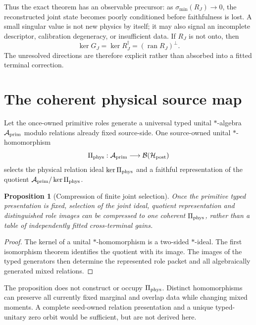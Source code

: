 \documentclass[11pt]{article}
\newtheorem{proposition}{Proposition}
\newcommand{\Aprim}{\mathcal A_{\rm prim}}
\begin{document}
Thus the exact theorem has an observable precursor: as
\(\sigma_{\min}(R_J)\to0\), the reconstructed joint state becomes poorly
conditioned before faithfulness is lost.  A small singular value is not new
physics by itself; it may also signal an incomplete descriptor, calibration
degeneracy, or insufficient data.  If \(R_J\) is not onto, then
\begin{equation}
 \ker G_J=\ker R_J^\dagger=(\operatorname{ran}R_J)^\perp.
 \label{eq:gram-kernel}
\end{equation}
The unresolved directions are therefore explicit rather than absorbed into a
fitted terminal correction.

\section{The coherent physical source map}

Let the once-owned primitive roles generate a universal typed unital
\(*\)-algebra \(\Aprim\) modulo relations already fixed source-side.  One
source-owned unital \(*\)-homomorphism
\begin{equation}
 \Pi_{\rm phys}:\Aprim\longrightarrow\mathcal B(\mathcal H_{\rm post})
 \label{eq:pi-phys}
\end{equation}
selects the physical relation ideal \(\ker\Pi_{\rm phys}\) and a faithful
representation of the quotient
\(\Aprim/\ker\Pi_{\rm phys}\).

\begin{proposition}[Compression of finite joint selection]
Once the primitive typed presentation is fixed, selection of the joint ideal,
quotient representation and distinguished role images can be compressed to
one coherent \(\Pi_{\rm phys}\), rather than a table of independently fitted
cross-terminal gains.
\end{proposition}
\begin{proof}
The kernel of a unital \(*\)-homomorphism is a two-sided \(*\)-ideal.  The
first isomorphism theorem identifies the quotient with its image.  The images
of the typed generators then determine the represented role packet and all
algebraically generated mixed relations.
\end{proof}

The proposition does not construct or occupy \(\Pi_{\rm phys}\).  Distinct
homomorphisms can preserve all currently fixed marginal and overlap data while
changing mixed moments.  A complete seed-owned relation presentation and a
unique typed-unitary zero orbit would be sufficient, but are not derived here.
\end{document}
